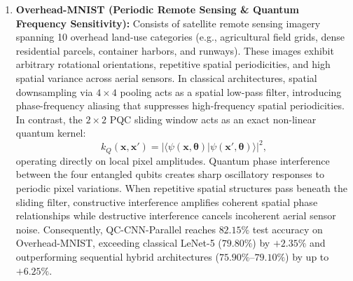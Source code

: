\documentclass[journal]{IEEEtran}
\begin{document}
\begin{enumerate}
    \item \textbf{Overhead-MNIST (Periodic Remote Sensing \& Quantum Frequency Sensitivity):} 
    Consists of satellite remote sensing imagery spanning 10 overhead land-use categories (e.g., agricultural field grids, dense residential parcels, container harbors, and runways). These images exhibit arbitrary rotational orientations, repetitive spatial periodicities, and high spatial variance across aerial sensors. In classical architectures, spatial downsampling via $4 \times 4$ pooling acts as a spatial low-pass filter, introducing phase-frequency aliasing that suppresses high-frequency spatial periodicities.
    In contrast, the $2 \times 2$ PQC sliding window acts as an exact non-linear quantum kernel:
    \begin{equation}
    k_Q(\mathbf{x}, \mathbf{x}') = |\langle \psi(\mathbf{x}, \boldsymbol{\theta}) | \psi(\mathbf{x}', \boldsymbol{\theta}) \rangle|^2,
    \label{eq:quantum_kernel_overlap}
    \end{equation}
    operating directly on local pixel amplitudes. Quantum phase interference between the four entangled qubits creates sharp oscillatory responses to periodic pixel variations. When repetitive spatial structures pass beneath the sliding filter, constructive interference amplifies coherent spatial phase relationships while destructive interference cancels incoherent aerial sensor noise. Consequently, QC-CNN-Parallel reaches $82.15\%$ test accuracy on Overhead-MNIST, exceeding classical LeNet-5 ($79.80\%$) by $+2.35\%$ and outperforming sequential hybrid architectures ($75.90\%$--$79.10\%$) by up to $+6.25\%$.
\end{enumerate}
\end{document}

